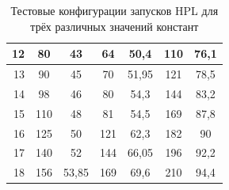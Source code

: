\begin{table}
\begin{tabular}{|r||c|c||c|c||c|c|}
			12          &  80 &                     43 &  64 &                   50,4 & 110 & 76,1                   \\ \hline
			13          &  90 &                     45 &  70 &                  51,95 & 121 & 78,5                   \\ \hline
			14          &  98 &                     46 &  80 &                   54,3 & 144 & 83,2                   \\ \hline
			15          & 110 &                     48 &  81 &                   54,5 & 169 & 87,8                   \\ \hline
			16          & 125 &                     50 & 121 &                   62,3 & 182 & 90                     \\ \hline
			17          & 140 &                     52 & 144 &                  66,05 & 196 & 92,2                   \\ \hline
			18          & 156 &                  53,85 & 169 &                   69,6 & 210 & 94,4                   \\ \hline
		\end{tabular}
		\caption{Тестовые конфигурации запусков HPL для трёх различных значений констант}
		\label{test_HPL}
	\end{table}
